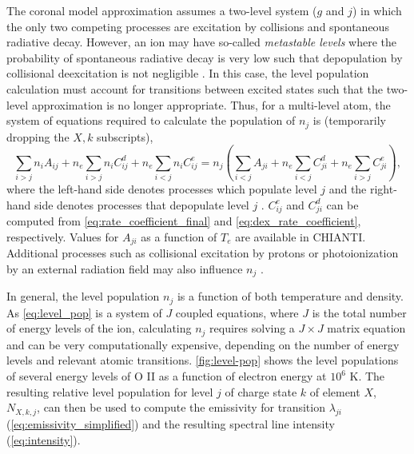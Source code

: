 The coronal model approximation assumes a two-level system ($g$ and $j$) in which the only two competing processes are excitation by collisions and spontaneous radiative decay. However, an ion may have so-called \textit{metastable levels} where the probability of spontaneous radiative decay is very low such that depopulation by collisional deexcitation is not negligible \citep{phillips_ultraviolet_2008,del_zanna_solar_2018}. In this case, the level population calculation must account for transitions between excited states such that the two-level approximation is no longer appropriate. Thus, for a multi-level atom, the system of equations required to calculate the population of $n_j$ is (temporarily dropping the $X,k$ subscripts),
\begin{equation}\label{eq:level_pop}
\sum_{i>j}n_iA_{ij} + n_e\sum_{i>j}n_iC_{ij}^d + n_e\sum_{i<j}n_iC_{ij}^e
= n_j\left(\sum_{i<j}A_{ji} + n_e\sum_{i<j}C_{ji}^d + n_e\sum_{i>j}C_{ji}^e\right),
\end{equation}
where the left-hand side denotes processes which populate level $j$ and the right-hand side denotes processes that depopulate level $j$ \citep{del_zanna_solar_2018}. $C_{ij}^e$ and $C_{ji}^d$ can be computed from \autoref{eq:rate_coefficient_final} and \autoref{eq:dex_rate_coefficient}, respectively. Values for $A_{ji}$ as a function of $T_e$ are available in CHIANTI. Additional processes such as collisional excitation by protons or photoionization by an external radiation field may also influence $n_j$ \citep[see sections 3.4.1 and 3.4.2 of][]{del_zanna_solar_2018}.

In general, the level population $n_j$ is a function of both temperature and density. As \autoref{eq:level_pop} is a system of $J$ coupled equations, where $J$ is the total number of energy levels of the ion, calculating $n_j$ requires solving a $J\times J$ matrix equation and can be very computationally expensive, depending on the number of energy levels and relevant atomic transitions. \autoref{fig:level-pop} shows the level populations of several energy levels of O II as a function of electron energy at $10^6$ K. The resulting relative level population for level $j$ of charge state $k$ of element $X$, $N_{X,k,j}$, can then be used to compute the emissivity for transition $\lambda_{ji}$ (\autoref{eq:emissivity_simplified}) and the resulting spectral line intensity (\autoref{eq:intensity}).

